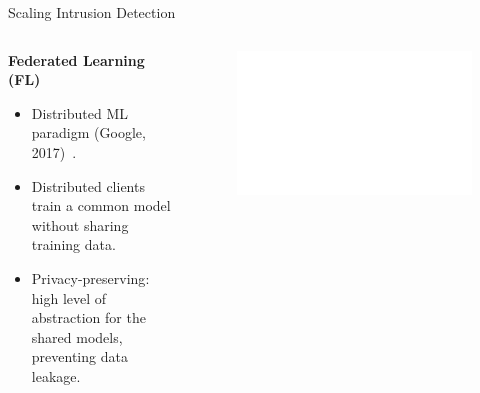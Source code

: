 \begin{frame}{Scaling Intrusion Detection}

  \begin{columns}
    \begin{column}{0.4\textwidth}
      \textbf{Federated Learning (FL)}
      \small
      \begin{itemize}[<+->]
        \item Distributed ML paradigm (Google, 2017)~\autocite{mcmahan_Communicationefficientlearningdeep_2017}.
        \item Distributed clients  train a common model without sharing training data.
        \item \alert{Privacy-preserving}: high level of abstraction for the shared models, preventing data leakage.
      \end{itemize}
    \end{column}
    
    \begin{column}{0.6\textwidth}
      \begin{figure}
        \centering
        \includegraphics[width=\linewidth]{figures/intro/fl.drawio.pdf}
      \end{figure}
    \end{column}
  \end{columns}

\end{frame}

